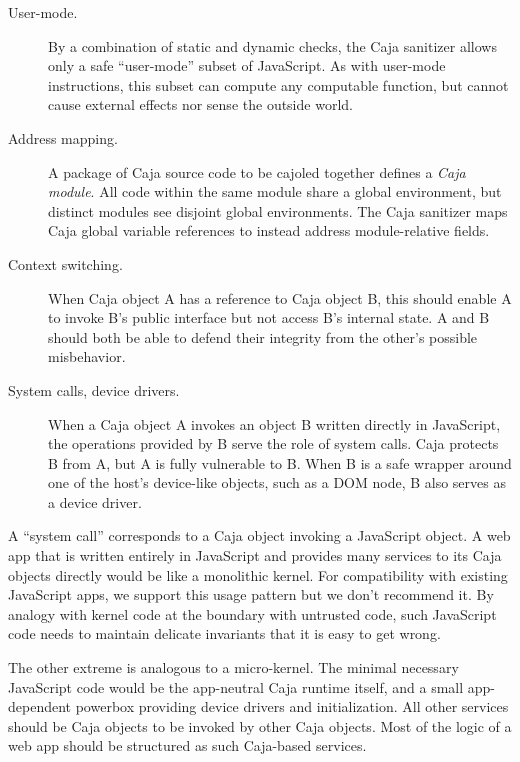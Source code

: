\documentclass[letterpaper,twocolumn,10pt]{article}
\begin{document}
\begin{description}

  \item[User-mode.] By a combination of static and dynamic checks, the Caja 
  sanitizer allows only a safe ``user-mode'' subset of JavaScript. As with 
  user-mode instructions, this subset can compute any computable function, 
  but cannot cause external effects nor sense the outside world.

  \item[Address mapping.] A package of Caja source code to be cajoled 
  together defines a \emph{Caja module}. All code within the same module 
  share a global environment, but distinct modules see disjoint global 
  environments. The Caja sanitizer maps Caja global variable references to 
  instead address module-relative fields.

  \item[Context switching.] When Caja object A has a reference to Caja 
  object B, this should enable A to invoke B's public interface but not 
  access B's internal state. A and B should both be able to defend their 
  integrity from the other's possible misbehavior.

  \item[System calls, device drivers.] When a Caja object A invokes an 
  object B written directly in JavaScript, the operations provided by B serve 
  the role of system calls. Caja protects B from A, but A is fully 
  vulnerable to B. When B is a safe wrapper around one of the host's 
  device-like objects, such as a DOM node, B also serves as a device driver.

\end{description}

A ``system call'' corresponds to a Caja object invoking a JavaScript object. 
A web app that is written entirely in JavaScript and provides many services 
to its Caja objects directly would be like a monolithic kernel. For 
compatibility with existing JavaScript apps, we support this usage pattern 
but we don't recommend it. By analogy with kernel code at the boundary with 
untrusted code, such JavaScript code needs to maintain delicate invariants 
that it is easy to get wrong.

The other extreme is analogous to a micro-kernel. The minimal necessary 
JavaScript code would be the app-neutral Caja runtime itself, and a small 
app-dependent powerbox providing device drivers and initialization. All other 
services should be Caja objects to be invoked by other Caja objects. Most 
of the logic of a web app should be structured as such Caja-based services.
\end{document}
